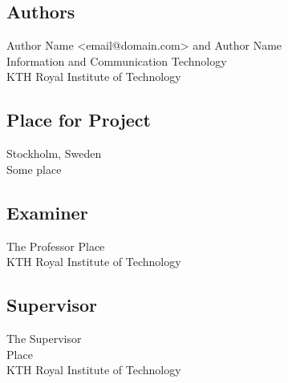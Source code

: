 \vfill
{ 
	\subsection*{Authors}
	Author Name <email@domain.com> and Author Name\\
	Information and Communication Technology\\
	KTH Royal Institute of Technology
	
	\subsection*{Place for Project}
	Stockholm, Sweden\\
	Some place
	
	\subsection*{Examiner}
	The Professor
	Place \\
	KTH Royal Institute of Technology
	
	\subsection*{Supervisor }
	The Supervisor\\
	Place\\
	KTH Royal Institute of Technology
	~
	
}


